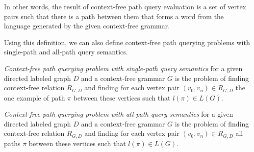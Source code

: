 In other words, the result of context-free path query evaluation is a set of vertex pairs such that there is a path between them that forms a word from the language generated by the given context-free grammar.

Using this definition, we can also define context-free path querying problems with single-path and all-path query semantics.

\begin{definition}
	\emph{Context-free path querying problem with single-path query semantics} for a given directed labeled graph $D$ and a context-free grammar $G$ is the problem of finding context-free relation $R_{G, D}$ and finding for each vertex pair $(v_0, v_n) \in R_{G, D}$ the one example of path $\pi$ between these vertices such that $l(\pi) \in L(G)$.
\end{definition}

\begin{definition}
	\emph{Context-free path querying problem with all-path query semantics} for a given directed labeled graph $D$ and a context-free grammar $G$ is the problem of finding context-free relation $R_{G, D}$ and finding for each vertex pair $(v_0, v_n) \in R_{G, D}$ all paths $\pi$ between these vertices such that $l(\pi) \in L(G)$.
\end{definition}
